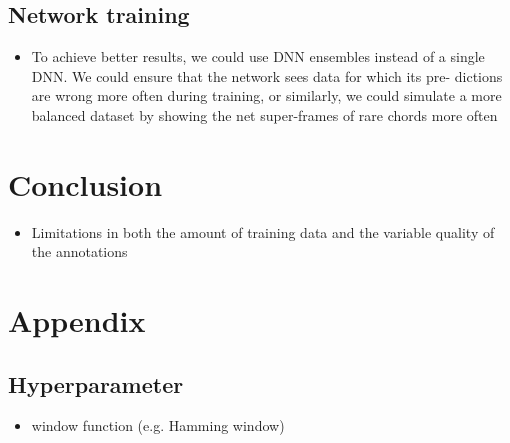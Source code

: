 \documentclass{article}
\begin{document}
\subsection{Network training}

\begin{itemize}
\item To achieve better results, we could use DNN ensembles instead of a single DNN. We could ensure that the network sees data for which its pre- dictions are wrong more often during training, or similarly, we could simulate a more balanced dataset by showing the net super-frames of rare chords more often \cite{Korzeniowski2016}
\end{itemize}


\section{Conclusion}

\begin{itemize}
\item Limitations in both the amount of training data and the variable quality of the annotations 
\end{itemize}





\section{Appendix}

\subsection{Hyperparameter} 
\begin{itemize}
\item window function (e.g. Hamming window)
\end{itemize}




\end{document}
